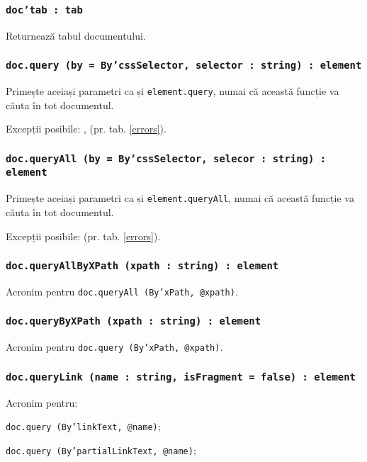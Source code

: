 \subsubsection{\texttt{doc'tab : tab}}

Returnează tabul documentului.

\subsubsection{\texttt{doc.query (by = By'cssSelector, selector : string) : element}}

Primește aceiași parametri ca și  \texttt{element.query}, numai că această funcție va căuta în tot documentul.

Excepții posibile: ,  (pr. tab. \ref{errors}).

\subsubsection{\texttt{doc.queryAll (by = By'cssSelector, selecor : string) : element}}

Primește aceiași parametri ca și \texttt{element.queryAll}, numai că această funcție va căuta în tot documentul.

Excepții posibile:  (pr. tab. \ref{errors}).

\subsubsection{\texttt{doc.queryAllByXPath (xpath : string) : element}}

Acronim pentru \texttt{doc.queryAll (By'xPath, @xpath)}.

\subsubsection{\texttt{doc.queryByXPath (xpath : string) : element}}

Acronim pentru \texttt{doc.query (By'xPath, @xpath)}.

\subsubsection{\texttt{doc.queryLink (name : string, isFragment = false) : element}}

Acronim pentru:
\begin{icItems}
	\item \texttt{doc.query (By'linkText, @name)};
	\item \texttt{doc.query (By'partialLinkText, @name)};
\end{icItems}

